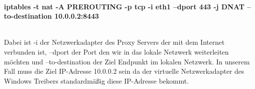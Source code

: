 \\ 
\begin{center}
    \textbf{iptables -t nat -A PREROUTING -p tcp -i eth1 --dport 443 -j DNAT --to-destination 10.0.0.2:8443}
\end{center}
\ \\
Dabei ist -i der Netzwerkadapter des Proxy Servers der mit dem Internet verbunden ist, --dport der Port den wir in das lokale Netzwerk weiterleiten möchten und --to-destination der Ziel Endpunkt im lokalen Netzwerk. In unserem Fall muss die Ziel IP-Adresse 10.0.0.2 sein da der virtuelle Netzwerkadapter des Windows Treibers standardmäßig diese IP-Adresse bekommt.